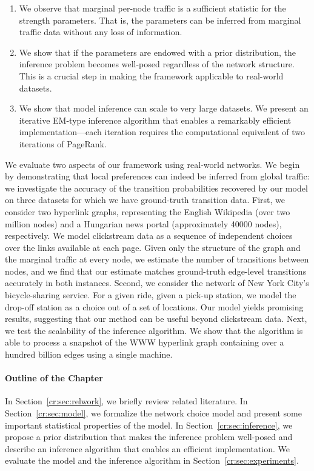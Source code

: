 \begin{enumerate}
\item We observe that marginal per-node traffic is a sufficient statistic for the strength parameters.
That is, the parameters can be inferred from marginal traffic data without any loss of information.

\item We show that if the parameters are endowed with a prior distribution, the inference problem becomes well-posed regardless of the network structure.
This is a crucial step in making the framework applicable to real-world datasets.

\item We show that model inference can scale to very large datasets.
We present an iterative EM-type inference algorithm that enables a remarkably efficient implementation---each iteration requires the computational equivalent of two iterations of PageRank.
\end{enumerate}


We evaluate two aspects of our framework using real-world networks.
We begin by demonstrating that local preferences can indeed be inferred from global traffic: we investigate the accuracy of the transition probabilities recovered by our model on three datasets for which we have ground-truth transition data.
First, we consider two hyperlink graphs, representing the English Wikipedia (over two million nodes) and a Hungarian news portal (approximately \num{40000} nodes), respectively.
We model clickstream data as a sequence of independent choices over the links available at each page.
Given only the structure of the graph and the marginal traffic at every node, we estimate the number of transitions between nodes, and we find that our estimate matches ground-truth edge-level transitions accurately in both instances.
Second, we consider the network of New York City's bicycle-sharing service.
For a given ride, given a pick-up station, we model the drop-off station as a choice out of a set of locations.
Our model yields promising results, suggesting that our method can be useful beyond clickstream data.
Next, we test the scalability of the inference algorithm.
We show that the algorithm is able to process a snapshot of the WWW hyperlink graph containing over a hundred billion edges using a single machine.

\paragraph{Outline of the Chapter}
In Section~\ref{cr:sec:relwork}, we briefly review related literature.
In Section~\ref{cr:sec:model}, we formalize the network choice model and present some important statistical properties of the model.
In Section~\ref{cr:sec:inference}, we propose a prior distribution that makes the inference problem well-posed and describe an inference algorithm that enables an efficient implementation.
We evaluate the model and the inference algorithm in Section~\ref{cr:sec:experiments}.
